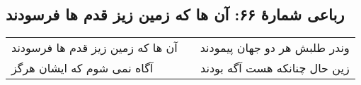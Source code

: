 \begin{center}
\section*{رباعی شمارهٔ ۶۶: آن ها که زمین زیز قدم ها فرسودند}
\label{sec:066}
\begin{longtable}{l p{0.5cm} r}
آن ها که زمین زیز قدم ها فرسودند
&&
وندر طلبش هر دو جهان پیمودند
\\
آگاه نمی شوم که ایشان هرگز
&&
زین حال چنانکه هست آگه بودند
\\
\end{longtable}
\end{center}
